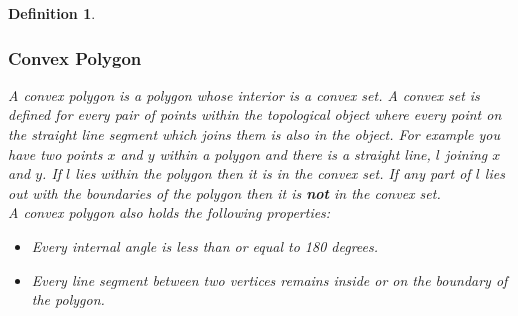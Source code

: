 \documentclass[12pt]{article}
\newtheorem{definition}{Definition}
\begin{document}
\begin{definition}
\subsubsection{Convex Polygon}
A convex polygon is a polygon whose interior is a convex set. A convex set is defined for every pair of points within the topological object where every point on the straight line segment which joins them is also in the object. For example you have two points $x$ and $y$ within a polygon and there is a straight line, $l$ joining $x$ and $y$. If $l$ lies within the polygon then it is in the convex set. If any part of $l$ lies out with the boundaries of the polygon then it is {\bf not} in the convex set.\\
A convex polygon also holds the following properties:
\begin{itemize}
\item Every internal angle is less than or equal to 180 degrees.
\item Every line segment between two vertices remains inside or on the boundary of the polygon.
\end{itemize}


\end{definition}
\end{document}
